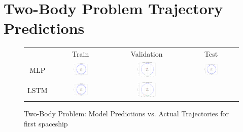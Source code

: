 \documentclass[11pt,a4paper, twocolumn]{article}
\begin{document}
\section{Two-Body Problem Trajectory Predictions}
\label{sec:two_body_predictions}
\begin{figure}[H]
  \centering
  \caption{Two-Body Problem: Model Predictions vs. Actual Trajectories for first spaceship}
  \label{fig:two_body_predictions}
  \begin{tabular}{cccc}
      & Train & Validation & Test \\
      MLP &
      \includegraphics[width=0.27\textwidth]{../inference_results/train/MLP/two_body/500/full_trajectory_spaceship_0.png} &
      \includegraphics[width=0.27\textwidth]{../inference_results/val/MLP/two_body/500/full_trajectory_spaceship_0.png} &
      \includegraphics[width=0.27\textwidth]{../inference_results/test/MLP/two_body/500/full_trajectory_spaceship_0.png} \\
      LSTM &
      \includegraphics[width=0.27\textwidth]{../inference_results/train/LSTM/two_body/500/full_trajectory_spaceship_0.png} &
      \includegraphics[width=0.27\textwidth]{../inference_results/val/LSTM/two_body/500/full_trajectory_spaceship_0.png} &

\end{tabular}
\end{figure}
\end{document}
